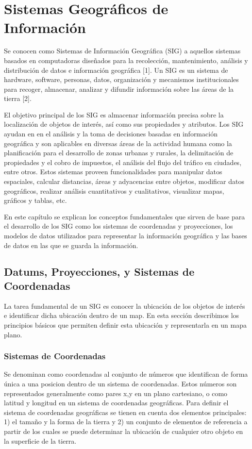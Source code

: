 \chapter{Sistemas Geográficos de Información}

Se conocen como Sistemas de Información Geográfica (SIG) a aquellos sistemas basados en computadoras diseñados para la recolección, mantenimiento, análisis y distribución de datos e información geográfica [1]. Un SIG es un sistema de hardware, software, personas, datos, organización y mecanismos institucionales para recoger, almacenar, analizar y difundir información sobre las áreas de la tierra [2].

El objetivo principal de los SIG es almacenar información precisa sobre la localización de objetos de interés, así como sus propiedades y atributos. Los SIG ayudan en en el análisis y la toma de decisiones basadas en información geográfica y son aplicables en diversas áreas de la actividad humana como la planificación para el desarrollo de zonas urbanas y rurales, la delimitación de propiedades y el cobro de  impuestos, el análisis del flujo del tráfico en ciudades, entre otros. Estos sistemas proveen funcionalidades para manipular datos espaciales, calcular distancias, áreas y adyacencias entre objetos, modificar datos geográficos, realizar análisis cuantitativos y cualitativos, visualizar mapas, gráficos y tablas, etc.

En este capítulo se explican los conceptos fundamentales que sirven de base para el desarrollo de los SIG como los sistemas de coordenadas y proyecciones, los modelos de datos utilizados para representar la información geográfica y las bases de datos en las que se guarda la información.

\section{Datums, Proyecciones, y Sistemas de Coordenadas}

La tarea fundamental de un SIG es conocer la ubicación de los objetos de interés e identificar dicha ubicación dentro de un map. En esta sección describimos los principios básicos que permiten definir esta ubicación y representarla en un mapa plano.

\subsection{Sistemas de Coordenadas}

Se denominan como coordenadas al conjunto de números que identifican de forma única a una posicion dentro de un sistema de coordenadas. Estos números son representados generalmente como pares x,y en un plano cartesiano, o como latitud y longitud en un sistema de coordenadas geográficas. Para definir el sistema de coordenadas geográficas se tienen en cuenta dos elementos principales: 1) el tamaño y la forma de la tierra y 2) un conjunto de elementos de referencia a partir de los cuales se puede determinar la ubicación de cualquier otro objeto en la superficie de la tierra.

